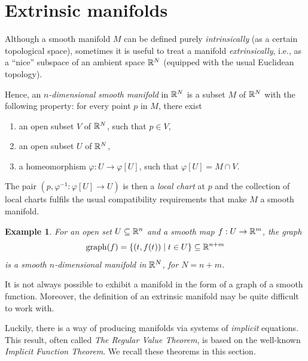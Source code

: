 \documentclass[11pt,a4paper,twoside,openany]{report}
\theoremstyle{my-theorem}
\theoremstyle{non-theorem}
\newtheorem{example}[theorem]{Example}
\begin{document}
	\section{Extrinsic manifolds}
	\label{sec:extrinsic-manifolds}
	
		Although a smooth manifold $M$ can be defined purely \emph{intrinsically} (as a certain topological space), sometimes it is useful to treat a manifold \emph{extrinsically}, i.e., as a ``nice'' subspace of an ambient space ${\mathbb R}^N$ (equipped with the usual Euclidean topology).
		
		Hence, an \emph{$n$-dimensional smooth manifold} in ${\mathbb R}^N$ is a subset $M$ of ${\mathbb R}^N$ with the following property: for every point $p$ in $M$, there exist
		\begin{enumerate}[label=\rm(\roman*)]
			\item an open subset $V$ of ${\mathbb R}^N$, such that $p \in V$,
			\item an open subset $U$ of ${\mathbb R}^N$,
			\item a homeomorphism $\varphi: U \to \varphi[U]$, such that $\varphi[U] = M \cap V$.
		\end{enumerate}
		The pair $(p,\varphi^{-1}:\varphi[U] \to U)$ is then a \emph{local chart} at $p$ and the collection of local charts fulfils the usual compatibility requirements that make $M$ a smooth manifold.
		
		\begin{example}
			For an open set $U \subseteq {\mathbb R}^n$ and a smooth map $f: U \to {\mathbb R}^m$, the \emph{graph}
			\begin{align*}
				\operatorname{graph}(f) = \{(t,f(t)) \mid t \in U\} \subseteq {\mathbb R}^{n+m}
			\end{align*}
			is a smooth $n$-dimensional manifold in ${\mathbb R}^N$, for $N=n+m$.
		\end{example}
		
		It is not always possible to exhibit a manifold in the form of a graph of a smooth function. Moreover, the definition of an extrinsic manifold may be quite difficult to work with.
		
		Luckily, there is a way of producing manifolds via systems of \emph{implicit} equations. This result, often called \emph{The Regular Value Theorem}, is based on the well-known \emph{Implicit Function Theorem}. We recall these theorems in this section.
		
\end{document}
